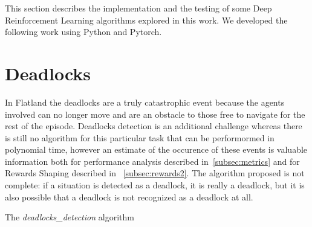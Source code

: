 \documentclass[11pt, a4paper, hidelinks]{report}
\begin{document}
This section describes the implementation and the testing of some Deep Reinforcement Learning algorithms explored in this work.
We developed the following work using Python and Pytorch.

\section{Deadlocks}

In Flatland the deadlocks are a truly catastrophic event because the agents involved can no longer move and are an obstacle to those free to navigate for the rest of the episode. 
Deadlocks detection is an additional challenge whereas there is still no algorithm for this particular task that can be performormed in polynomial time, however an estimate of the occurence of these events is valuable information both for performance analysis described in~\ref{subsec:metrics} and for Rewards Shaping described in ~\ref{subsec:rewards2}.
The algorithm proposed is not complete: if a situation is detected as a deadlock, it is really a deadlock, but it is also possible that a deadlock is not recognized as a deadlock at all.

\begin{algorithm}[H]


\caption{The \textit{deadlocks\_detection} algorithm}
\end{algorithm}
\end{document}
